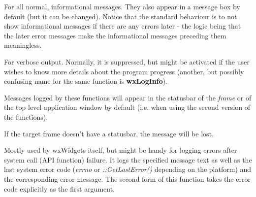 For all normal, informational messages. They also appear in a message box by
default (but it can be changed). Notice that the standard behaviour is to not
show informational messages if there are any errors later - the logic being
that the later error messages make the informational messages preceding them
meaningless.


\label{wxlogverbose}



For verbose output. Normally, it is suppressed, but
might be activated if the user wishes to know more details about the program
progress (another, but possibly confusing name for the same function is {\bf wxLogInfo}).


\label{wxlogstatus}





Messages logged by these functions will appear in the statusbar of the {\it
frame} or of the top level application window by default (i.e. when using
the second version of the functions).

If the target frame doesn't have a statusbar, the message will be lost.


\label{wxlogsyserror}



Mostly used by wxWidgets itself, but might be handy for logging errors after
system call (API function) failure. It logs the specified message text as well
as the last system error code ({\it errno} or {\it ::GetLastError()} depending
on the platform) and the corresponding error message. The second form
of this function takes the error code explicitly as the first argument.

